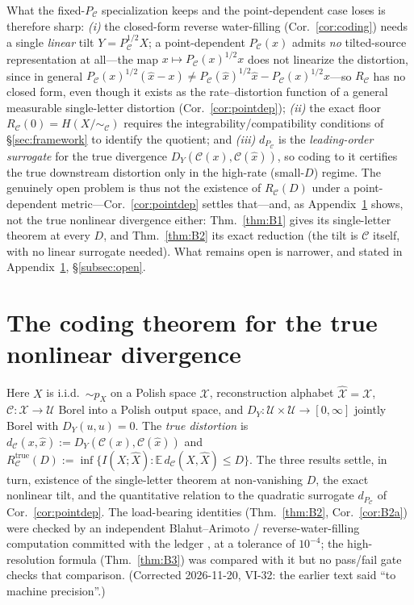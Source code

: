 \documentclass[11pt]{article}
\theoremstyle{definition}
\theoremstyle{remark}
\newcommand{\PC}{P_{\mathcal{C}}}
\newcommand{\E}{\mathbb{E}}
\begin{document}
\noindent What the fixed-$\PC$ specialization keeps and the point-dependent case
loses is therefore sharp: \emph{(i)} the closed-form reverse water-filling
(Cor.~\ref{cor:coding}) needs a single \emph{linear} tilt $Y=\PC^{1/2}X$; a
point-dependent $\PC(x)$ admits \emph{no} tilted-source representation at all---the map
$x\mapsto\PC(x)^{1/2}x$ does not linearize the distortion, since in general
$\PC(x)^{1/2}(\hat x-x)\neq\PC(\hat x)^{1/2}\hat x-\PC(x)^{1/2}x$---so
$R_{\mathcal{C}}$ has no closed form, even though it exists as the rate--distortion
function of a general measurable single-letter distortion (Cor.~\ref{cor:pointdep});
\emph{(ii)} the exact floor $R_{\mathcal{C}}(0)=H(X/\!\sim_{\mathcal{C}})$
requires the integrability/compatibility conditions of \S\ref{sec:framework} to
identify the quotient; and \emph{(iii)} $d_{\PC}$ is the \emph{leading-order surrogate}
for the true divergence $D_Y(\mathcal{C}(x),\mathcal{C}(\hat x))$, so coding to it
certifies the true downstream distortion only in the high-rate (small-$D$) regime. The
genuinely open problem is thus not the existence of $R_{\mathcal{C}}(D)$ under a
point-dependent metric---Cor.~\ref{cor:pointdep} settles that---and, as
Appendix~\ref{app:true} shows, not the true nonlinear divergence either:
Thm.~\ref{thm:B1} gives its single-letter theorem at every $D$, and Thm.~\ref{thm:B2}
its exact reduction (the tilt is $\mathcal{C}$ itself, with no linear surrogate needed).
What remains open is narrower, and stated in Appendix~\ref{app:true}, \S\ref{subsec:open}.

\section{The coding theorem for the true nonlinear divergence}
\label{app:true}

Here $X$ is i.i.d.\ $\sim p_X$ on a Polish space $\mathcal{X}$, reconstruction
alphabet $\hat{\mathcal{X}}=\mathcal{X}$, $\mathcal{C}:\mathcal{X}\to\mathcal{U}$ Borel
into a Polish output space, and $D_Y:\mathcal{U}\times\mathcal{U}\to[0,\infty]$ jointly
Borel with $D_Y(u,u)=0$. The \emph{true distortion} is
$d_{\mathcal{C}}(x,\hat x):=D_Y(\mathcal{C}(x),\mathcal{C}(\hat x))$ and
$R_{\mathcal{C}}^{\mathrm{true}}(D):=\inf\{I(X;\hat X):\E\,d_{\mathcal{C}}(X,\hat X)\le
D\}$. The three results settle, in turn, existence of the single-letter theorem at
non-vanishing $D$, the exact nonlinear tilt, and the quantitative relation to the
quadratic surrogate $d_{\PC}$ of Cor.~\ref{cor:pointdep}. The load-bearing identities
(Thm.~\ref{thm:B2}, Cor.~\ref{cor:B2a}) were checked by an independent Blahut--Arimoto /
reverse-water-filling computation committed with the ledger \cite{ledger2026}, at a
tolerance of $10^{-4}$; the high-resolution formula (Thm.~\ref{thm:B3}) was compared with
it but no pass/fail gate checks that comparison. (Corrected 2026-11-20, VI-32: the earlier
text said ``to machine precision''.)
\end{document}
